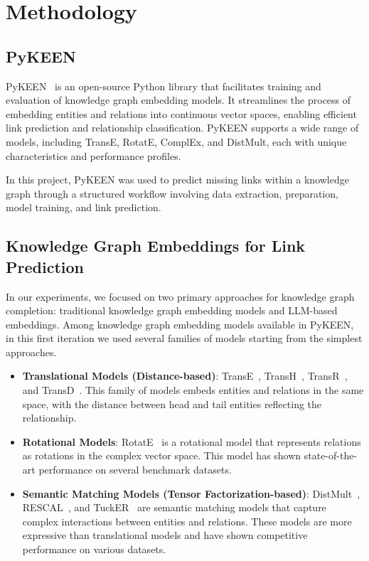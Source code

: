 \section*{Methodology}

\subsection*{PyKEEN}

PyKEEN~\cite{pykeen} is an open-source Python library that facilitates training and evaluation of knowledge graph embedding models.
It streamlines the process of embedding entities and relations into continuous vector spaces, enabling efficient link prediction and relationship classification.
PyKEEN supports a wide range of models, including TransE, RotatE, ComplEx, and DistMult, each with unique characteristics and performance profiles.

In this project, PyKEEN was used to predict missing links within a knowledge graph through a structured workflow involving data extraction, preparation, model training, and link prediction.

\subsection*{Knowledge Graph Embeddings for Link Prediction}

In our experiments, we focused on two primary approaches for knowledge graph completion: traditional knowledge graph embedding models and LLM-based embeddings.
Among knowledge graph embedding models available in PyKEEN, in this first iteration we used several families of models starting from the simplest approaches.
\begin{itemize}
    \item \textbf{Translational Models (Distance-based)}: TransE~\cite{10.5555/2999792.2999923}, TransH~\cite{10.5555/2893873.2894046}, TransR~\cite{10.5555/2886521.2886624}, and TransD~\cite{ji-etal-2015-knowledge}.
    This family of models embeds entities and relations in the same space, with the distance between head and tail entities reflecting the relationship.
    \item \textbf{Rotational Models}: RotatE~\cite{sun2019rotateknowledgegraphembedding} is a rotational model that represents relations as rotations in the complex vector space. This model has shown state-of-the-art performance on several benchmark datasets.
    \item \textbf{Semantic Matching Models (Tensor Factorization-based)}: DistMult~\cite{yang2015embeddingentitiesrelationslearning }, RESCAL~\cite{10.5555/3104482.3104584}, and TuckER~\cite{Balazevic_2019} are semantic matching models that capture complex interactions between entities and relations. These models are more expressive than translational models and have shown competitive performance on various datasets.
\end{itemize}

